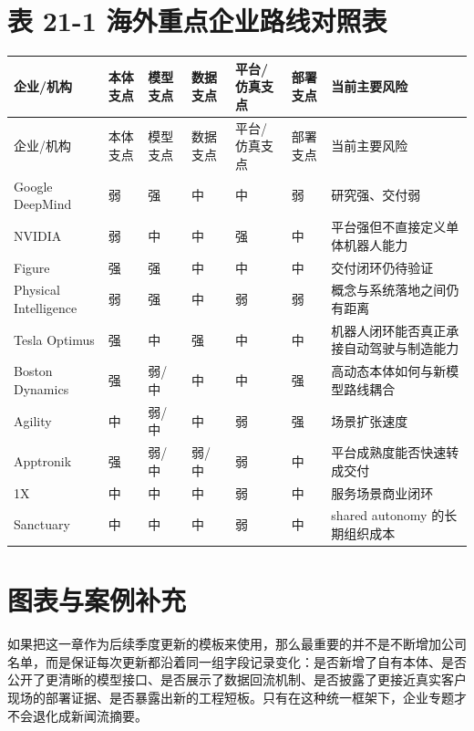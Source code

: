 \chapter*{表 21-1 海外重点企业路线对照表}

\begingroup
\small
\begin{xltabular}{\textwidth}{YYYYYYY}
\toprule
企业/机构 & 本体支点 & 模型支点 & 数据支点 & 平台/仿真支点 & 部署支点 & 当前主要风险 \\
\midrule
\endfirsthead
\toprule
企业/机构 & 本体支点 & 模型支点 & 数据支点 & 平台/仿真支点 & 部署支点 & 当前主要风险 \\
\midrule
\endhead
Google DeepMind & 弱 & 强 & 中 & 中 & 弱 & 研究强、交付弱 \\
NVIDIA & 弱 & 中 & 中 & 强 & 中 & 平台强但不直接定义单体机器人能力 \\
Figure & 强 & 强 & 中 & 中 & 中 & 交付闭环仍待验证 \\
Physical Intelligence & 弱 & 强 & 中 & 弱 & 弱 & 概念与系统落地之间仍有距离 \\
Tesla Optimus & 强 & 中 & 强 & 中 & 中 & 机器人闭环能否真正承接自动驾驶与制造能力 \\
Boston Dynamics & 强 & 弱/中 & 中 & 中 & 强 & 高动态本体如何与新模型路线耦合 \\
Agility & 中 & 弱/中 & 中 & 弱 & 强 & 场景扩张速度 \\
Apptronik & 强 & 弱/中 & 弱/中 & 弱 & 中 & 平台成熟度能否快速转成交付 \\
1X & 中 & 中 & 中 & 弱 & 中 & 服务场景商业闭环 \\
Sanctuary & 中 & 中 & 中 & 弱 & 中 & shared autonomy 的长期组织成本 \\
\bottomrule
\end{xltabular}
\endgroup

\chapter*{图表与案例补充}

如果把这一章作为后续季度更新的模板来使用，那么最重要的并不是不断增加公司名单，而是保证每次更新都沿着同一组字段记录变化：是否新增了自有本体、是否公开了更清晰的模型接口、是否展示了数据回流机制、是否披露了更接近真实客户现场的部署证据、是否暴露出新的工程短板。只有在这种统一框架下，企业专题才不会退化成新闻流摘要。

